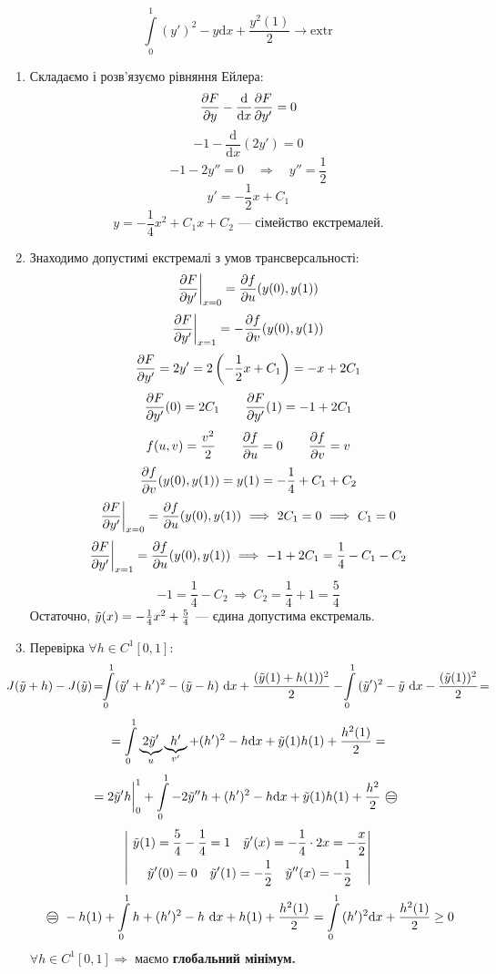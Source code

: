 \begin{example}
  $$
   \int\limits_{0}^{1}{ (y')^2 - y} \mathrm{d} x + \frac{y^2(1)}{2}  \longrightarrow \mathrm{extr}
  $$
\begin{spacing}{1}
\begin{enumerate}
  \item Складаємо і розв'язуємо рівняння Ейлера:
  $$
  \frac{\partial F}{\partial y}  - \frac{\mathrm{d} }{\mathrm{d} x} \frac{\partial F}{\partial y'} = 0
  $$
  $$
  -1 - \frac{\mathrm{d}}{\mathrm{d} x} (2y') = 0
  $$
  $$
  -1 - 2y'' = 0 \quad \Longrightarrow \quad y'' = \frac{1}{2}
  $$
  $$
  y' = - \frac{1}{2} x + C_1
  $$
  $$
  y = - \frac{1}{4} x^2 + C_1 x + C_2 \text{ --- сімейство екстремалей.}
  $$
  \item Знаходимо допустимі екстремалі з умов трансверсальності:
  $$
  \frac{\partial F}{\partial y' } \bigg|_{x=0} = \frac{\partial f}{ \partial u} (y(0), y(1))
  $$
  $$
  \frac{\partial F}{\partial y' } \bigg|_{x=1} = - \frac{\partial f}{ \partial v} (y(0), y(1))
  $$
  $$
  \frac{\partial F}{\partial y'} =2 y' = 2 \left( - \frac{1}{2} x + C_1  \right) = - x + 2C_1
  $$
  $$
\frac{\partial F}{\partial y'} (0) = 2C_1 \qquad \frac{\partial F}{\partial y'} (1) = -1 + 2 C_1
  $$
  $$
  f(u,v) = \frac{v^2}{2} \qquad \frac{\partial f}{ \partial u} = 0 \qquad \frac{\partial f}{ \partial v} = v
  $$
  $$
  \frac{\partial f}{\partial v} (y(0), y(1)) = y(1) = - \frac{1}{4} + C_1 + C_2
  $$
  $$
  \frac{\partial F}{\partial y' } \bigg|_{x =0 } = \frac{\partial f}{\partial u} (y(0), y(1)) \ \Longrightarrow \  2 C_1 = 0 \ \Longrightarrow \  C_1 = 0
  $$
  $$
  \frac{\partial F}{\partial y' }\bigg|_{x=1} =   \frac{\partial f}{\partial u} (y(0), y(1))
  \ \Longrightarrow \   -1 + 2C_1 = \frac{1}{4} - C_1 - C_2
  $$
  $$
  -1 = \frac{1}{4} - C_2  \ \Longrightarrow \   C_2 = \frac{1}{4} + 1 = \frac{5}{4}
  $$
  Остаточно, $\tilde{y}(x) = - \frac{1}{4} x^2 + \frac{5}{4}  $ --- єдина допустима екстремаль.
  \item Перевірка $\forall h \in C^1 [0,1]$:
  $$
    \hspace*{-2em}
  J(\ty + h) - J(
  \ty
  ) \!=\!\!  \int\limits_{0}^{1} (\ty'+ h')^2 - (\ty - h)\  \mathrm{d} x +  \frac{(\ty(1) + h(1))^2}{ 2} - \! \int\limits_{0}^{1}{(\ty')^2 - \ty\  \mathrm{d}x} - \frac{(\ty (1))^2}{2}\! =\!
  $$
  $$
  =  \int\limits_{0}^{ 1}{\underbrace{2\tilde{y}'}_{u}\underbrace{h'}_{v'} + (h')^2 - h} \mathrm{d} x  + \tilde{y}(1)h(1) + \frac{h^2 (1)}{2}  =
  $$
  $$
=2\ty' h\bigg|_{0}^1 +  \int\limits_{0}^{1}{ -2 \ty'' h + (h')^2 - h \mathrm{d} x} + \ty(1) h(1) + \frac{h^2}{2} \oeq
  $$
  $$
  \left| \
  \begin{gathered}
    \tilde{y}(1) = \frac{5}{4} - \frac{1}{4} = 1 \quad  \tilde{y}'(x) = - \frac{1}{4} \cdot 2 x = - \frac{x}{2}  \\
     \tilde{y}'(0)=0 \quad \tilde{y}'(1) = - \frac{1}{2} \quad \tilde{y}''(x) = -\frac{1}{2}
  \end{gathered}
   \right|
  $$
  $$
  \oeq - h(1) +  \int\limits_{0}^{1}{ h + (h')^2 - h \ \mathrm{d} x} + h(1) +
  \frac{h^2(1)}{2}
  =  \int\limits_{0}^{1}{(h')^2 \mathrm{d} x} + \frac{h^2(1)}{2} \geq 0
  $$
  $
  \forall h \in C^1[0,1] \Longrightarrow
  $ маємо \textbf{глобальний мінімум.}
\end{enumerate}
\end{spacing}
\end{example}

